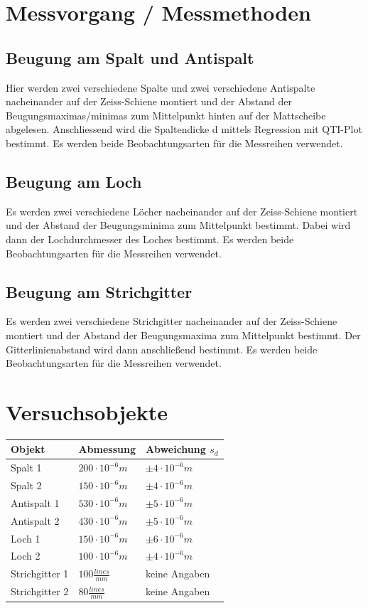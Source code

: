 \section{Messvorgang / Messmethoden}
\subsection{Beugung am Spalt und Antispalt}
Hier werden zwei verschiedene Spalte und zwei verschiedene Antispalte nacheinander auf der Zeiss-Schiene montiert und der Abstand der Beugungsmaximas/minimas zum Mittelpunkt hinten auf der Mattscheibe abgelesen. Anschliessend wird die Spaltendicke d mittels Regression mit QTI-Plot bestimmt. Es werden beide Beobachtungsarten für die Messreihen verwendet.
\subsection{Beugung am Loch}
Es werden zwei verschiedene Löcher nacheinander auf der Zeiss-Schiene montiert und der Abstand der Beugungsminima zum Mittelpunkt bestimmt. Dabei wird dann der Lochdurchmesser des Loches bestimmt. Es werden beide Beobachtungsarten für die Messreihen verwendet.
\subsection{Beugung am Strichgitter}
Es werden zwei verschiedene Strichgitter nacheinander auf der Zeiss-Schiene montiert und der Abstand der Beugungsmaxima zum Mittelpunkt bestimmt. Der Gitterlinienabstand wird dann anschließend bestimmt. Es werden beide Beobachtungsarten für die Messreihen verwendet.
\section{Versuchsobjekte}
\begin{tabular}{|l|l|l|}
\toprule
Objekt & Abmessung & Abweichung $s_{d}$ \\ 
\toprule
Spalt 1& $200\cdot10^{-6}m$ & $\pm4\cdot10^{-6}m$\\ 
Spalt 2& $150\cdot10^{-6}m$ & $\pm4\cdot10^{-6}m$ \\ 
Antispalt 1& $530\cdot10^{-6}m$ & $\pm5\cdot10^{-6}m$ \\ 
Antispalt 2& $430\cdot10^{-6}m$ & $\pm5\cdot10^{-6}m$ \\ 
Loch 1& $150\cdot10^{-6}m$ & $\pm6\cdot10^{-6}m$ \\ 
Loch 2& $100\cdot10^{-6}m$ & $\pm4\cdot10^{-6}m$ \\ 
Strichgitter 1& $100\frac{lines}{mm}$ & keine Angaben \\ 
Strichgitter 2& $80\frac{lines}{mm}$ & keine Angaben \\ 
\bottomrule
\end{tabular} 